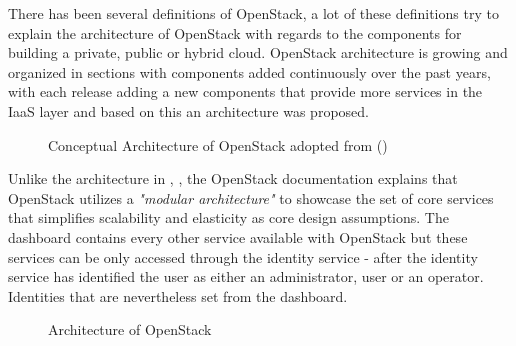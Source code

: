 There has been several definitions of OpenStack, a lot of these definitions try to explain the architecture of OpenStack with regards to the components for building a private, public or hybrid cloud. OpenStack architecture is growing and organized in sections with components added continuously over the past years, with each release adding a new components that provide more services in the IaaS layer \cite{kavanagh2015openstack} and based on this an architecture was proposed. 

\begin{figure}[h]
\centering
{}
  \caption{Conceptual Architecture of OpenStack adopted from \citeauthor{kavanagh2015openstack} (\citeyear{kavanagh2015openstack}) \cite{kavanagh2015openstack}}
  \label{fig: OpenStack_Arch}
\end{figure}

Unlike the architecture in \citeauthor{kavanagh2015openstack}, \citeyear{kavanagh2015openstack} \cite{kavanagh2015openstack}, the OpenStack documentation \cite{OpenStackBlog} explains that OpenStack utilizes a \textit{"modular architecture"} to showcase the set of core services that simplifies scalability and elasticity as core design assumptions. The dashboard contains every other service available with OpenStack but these services can be only accessed through the identity service - after the identity service has identified the user as either an administrator, user or an operator. Identities that are nevertheless set from the dashboard.

\begin{figure}[h]
\centering
{}
  \caption{Architecture of OpenStack}
  \label{fig: OpenStack_Arch_OpenStackDoc}
  \end{figure}
